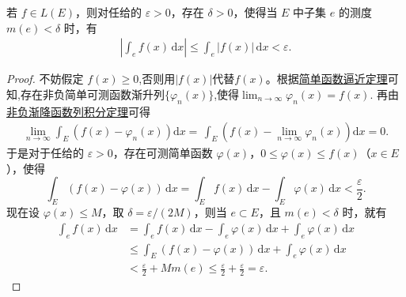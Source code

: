 \documentclass[../../main.tex]{subfiles}
\begin{document}
\begin{theorem}[积分的绝对连续性]\label{theorem:积分的绝对连续性}
若 $f \in L(E)$，则对任给的 $\varepsilon > 0$，存在 $\delta > 0$，使得当 $E$ 中子集 $e$ 的测度 $m(e) < \delta$ 时，有
\begin{align*}
\left| \int_e f(x) \, \mathrm{d}x \right| \leqslant \int_e |f(x)| \, \mathrm{d}x < \varepsilon.
\end{align*}
\end{theorem}
\begin{proof}
不妨假定 $f(x) \geqslant 0$,否则用$|f(x)|$代替$f(x)$。根据\hyperref[theorem:简单函数逼近定理]{简单函数逼近定理}可知,存在非负简单可测函数渐升列$\{\varphi_n(x)\}$,使得$\lim_{n\to \infty}\varphi_n(x)=f(x).$
再由\hyperref[corollary:非负渐降函数列积分定理]{非负渐降函数列积分定理}可得
\begin{align*}
\underset{n\rightarrow \infty}{\lim}\int_E{\left( f\left( x \right) -\varphi _n\left( x \right) \right) \mathrm{d}x}=\,\int_E{\left( f\left( x \right) -\underset{n\rightarrow \infty}{\lim}\varphi _n\left( x \right) \right) \mathrm{d}x}=0.
\end{align*}
于是对于任给的 $\varepsilon > 0$，存在可测简单函数 $\varphi(x)$，$0 \leqslant \varphi(x) \leqslant f(x)$（$x \in E$），使得
\[
\int_E (f(x) - \varphi(x)) \, \mathrm{d}x = \int_E f(x) \, \mathrm{d}x - \int_E \varphi(x) \, \mathrm{d}x < \frac{\varepsilon}{2}.
\]
现在设 $\varphi(x) \leqslant M$，取 $\delta = \varepsilon / (2M)$，则当 $e \subset E$，且 $m(e) < \delta$ 时，就有
\begin{align*}
\int_e f(x) \, \mathrm{d}x &= \int_e f(x) \, \mathrm{d}x - \int_e \varphi(x) \, \mathrm{d}x + \int_e \varphi(x) \, \mathrm{d}x \\
&\leqslant \int_E (f(x) - \varphi(x)) \, \mathrm{d}x + \int_e \varphi(x) \, \mathrm{d}x \\
&< \frac{\varepsilon}{2} + Mm(e) \leqslant \frac{\varepsilon}{2} + \frac{\varepsilon}{2} = \varepsilon.
\end{align*}

\end{proof}
\end{document}
